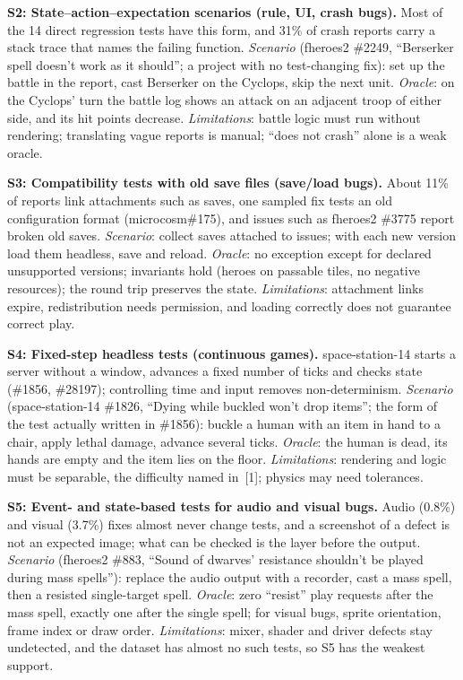 \documentclass[10pt,twocolumn,a4paper]{article}
\newcommand{\para}[1]{\par\smallskip\noindent\textbf{#1}\enspace}
\begin{document}
\para{S2: State--action--expectation scenarios (rule, UI, crash bugs).}
Most of the 14 direct regression tests have this form, and 31\% of crash reports carry a stack trace that names the failing function.
\emph{Scenario} (fheroes2 \#2249, ``Berserker spell doesn't work as it should''; a project with no test-changing fix): set up the battle in the report, cast Berserker on the Cyclops, skip the next unit.
\emph{Oracle}: on the Cyclops' turn the battle log shows an attack on an adjacent troop of either side, and its hit points decrease.
\emph{Limitations}: battle logic must run without rendering; translating vague reports is manual; ``does not crash'' alone is a weak oracle.

\para{S3: Compatibility tests with old save files (save/load bugs).}
About 11\% of reports link attachments such as saves, one sampled fix tests an old configuration format (microcosm\#175), and issues such as fheroes2 \#3775 report broken old saves.
\emph{Scenario}: collect saves attached to issues; with each new version load them headless, save and reload.
\emph{Oracle}: no exception except for declared unsupported versions; invariants hold (heroes on passable tiles, no negative resources); the round trip preserves the state.
\emph{Limitations}: attachment links expire, redistribution needs permission, and loading correctly does not guarantee correct play.

\para{S4: Fixed-step headless tests (continuous games).}
space-station-14 starts a server without a window, advances a fixed number of ticks and checks state (\#1856, \#28197); controlling time and input removes non-determinism.
\emph{Scenario} (space-station-14 \#1826, ``Dying while buckled won't drop items''; the form of the test actually written in \#1856): buckle a human with an item in hand to a chair, apply lethal damage, advance several ticks.
\emph{Oracle}: the human is dead, its hands are empty and the item lies on the floor.
\emph{Limitations}: rendering and logic must be separable, the difficulty named in~[1]; physics may need tolerances.

\para{S5: Event- and state-based tests for audio and visual bugs.}
Audio (0.8\%) and visual (3.7\%) fixes almost never change tests, and a screenshot of a defect is not an expected image; what can be checked is the layer before the output.
\emph{Scenario} (fheroes2 \#883, ``Sound of dwarves' resistance shouldn't be played during mass spells''): replace the audio output with a recorder, cast a mass spell, then a resisted single-target spell.
\emph{Oracle}: zero ``resist'' play requests after the mass spell, exactly one after the single spell; for visual bugs, sprite orientation, frame index or draw order.
\emph{Limitations}: mixer, shader and driver defects stay undetected, and the dataset has almost no such tests, so S5 has the weakest support.
\end{document}
